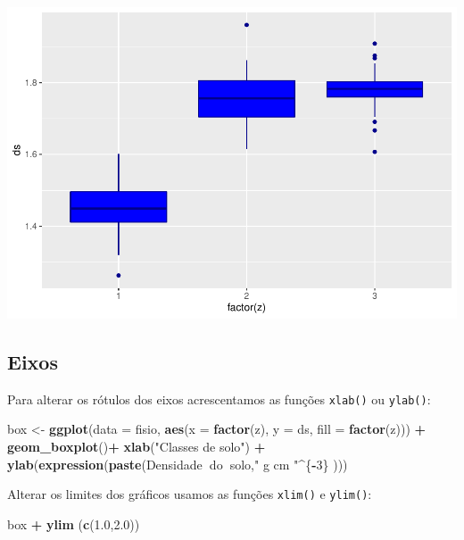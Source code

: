 \documentclass[
]{book}
\newenvironment{Shaded}{\begin{snugshade}}{\end{snugshade}}
\newcommand{\DataTypeTok}[1]{\textcolor[rgb]{0.13,0.29,0.53}{#1}}
\newcommand{\DecValTok}[1]{\textcolor[rgb]{0.00,0.00,0.81}{#1}}
\newcommand{\FloatTok}[1]{\textcolor[rgb]{0.00,0.00,0.81}{#1}}
\newcommand{\KeywordTok}[1]{\textcolor[rgb]{0.13,0.29,0.53}{\textbf{#1}}}
\newcommand{\NormalTok}[1]{#1}
\newcommand{\OperatorTok}[1]{\textcolor[rgb]{0.81,0.36,0.00}{\textbf{#1}}}
\newcommand{\StringTok}[1]{\textcolor[rgb]{0.31,0.60,0.02}{#1}}
\begin{document}
\includegraphics{TudodoR_files/figure-latex/unnamed-chunk-202-1.pdf}

\hypertarget{eixos}{%
\subsection{Eixos}\label{eixos}}

Para alterar os rótulos dos eixos acrescentamos as funções \texttt{xlab()} ou \texttt{ylab()}:

\begin{Shaded}
\begin{Highlighting}[]
\NormalTok{box <-}\StringTok{ }\KeywordTok{ggplot}\NormalTok{(}\DataTypeTok{data =}\NormalTok{ fisio, }\KeywordTok{aes}\NormalTok{(}\DataTypeTok{x =} \KeywordTok{factor}\NormalTok{(z), }\DataTypeTok{y =}\NormalTok{ ds, }\DataTypeTok{fill =} \KeywordTok{factor}\NormalTok{(z))) }\OperatorTok{+}
\StringTok{  }\KeywordTok{geom_boxplot}\NormalTok{()}\OperatorTok{+}
\StringTok{  }\KeywordTok{xlab}\NormalTok{(}\StringTok{"Classes de solo"}\NormalTok{) }\OperatorTok{+}
\StringTok{  }\KeywordTok{ylab}\NormalTok{(}\KeywordTok{expression}\NormalTok{(}\KeywordTok{paste}\NormalTok{(Densidade}\OperatorTok{~}\NormalTok{do}\OperatorTok{~}\NormalTok{solo,}\StringTok{" g cm "}\OperatorTok{^}\NormalTok{\{}\OperatorTok{-}\DecValTok{3}\NormalTok{\} )))}
\end{Highlighting}
\end{Shaded}

Alterar os limites dos gráficos usamos as funções \texttt{xlim()} e \texttt{ylim()}:

\begin{Shaded}
\begin{Highlighting}[]
\NormalTok{  box }\OperatorTok{+}\StringTok{ }\KeywordTok{ylim}\NormalTok{ (}\KeywordTok{c}\NormalTok{(}\FloatTok{1.0}\NormalTok{,}\FloatTok{2.0}\NormalTok{))}
\end{Highlighting}
\end{Shaded}
\end{document}
